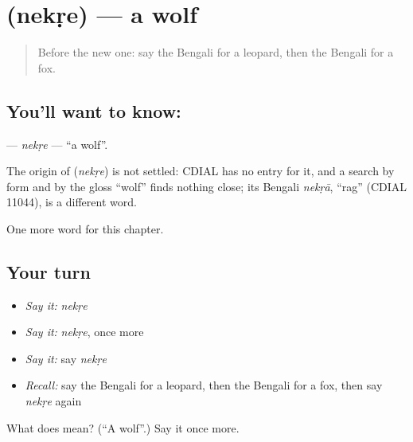 \section[\texorpdfstring{\bn{নেকড়ে} (nekṛe)}{নেকড়ে (nekṛe)}]{ (nekṛe) — a wolf}

\label{lesson:BN-C224-nekre}



\begin{quote}
Before the new one: say the Bengali for a leopard, then the Bengali for a fox.
\end{quote}

\subsection*{You'll want to know: }
\textbf{} — \emph{nekṛe} — \textquotedblleft{}a wolf\textquotedblright{}.

\begin{cousinweb}
The origin of \textbf{} (\emph{nekṛe}) is not settled: CDIAL has no entry for it, and a search by form and by the gloss \textquotedblleft{}wolf\textquotedblright{} finds nothing close; its Bengali \emph{nekṛā}, \textquotedblleft{}rag\textquotedblright{} (CDIAL 11044), is a different word.
\end{cousinweb}

\begin{grammarlens}[title={What you've built}]
One more word for this chapter.
\end{grammarlens}

\subsection*{Your turn}
\begin{itemize}
\raggedright
  \item \emph{Say it:} \emph{nekṛe}
  \item \emph{Say it:} \emph{nekṛe}, once more
  \item \emph{Say it:} say \emph{nekṛe}
  \item \emph{Recall:} say the Bengali for a leopard, then the Bengali for a fox, then say \emph{nekṛe} again
\end{itemize}

\begin{tcolorbox}[breakable,colback=teal!4,colframe=teal!35!black,title={Before you move on}]
What does  mean? (\textquotedblleft{}A wolf\textquotedblright{}.) Say it once more.
\end{tcolorbox}
